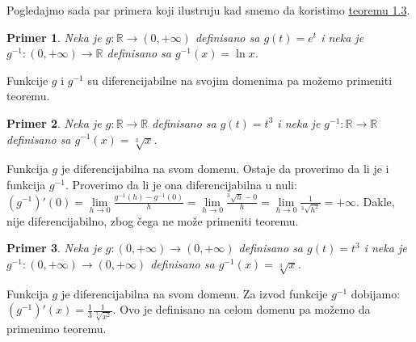 \documentclass{article}
\newtheorem{prim}{Primer}[section]
\begin{document}
Pogledajmo sada par primera koji ilustruju kad smemo da
koristimo \hyperref[teorema_1.3]{teoremu 1.3}.\par

\begin{primbox}
    \label{primer_1.9}
    \begin{prim}
        Neka je $g: \mathbb{R} \longrightarrow \left(0, +\infty\right)$ definisano sa
        $g\left(t\right) = e^t$ i neka je $g^{-1}:\left(0, +\infty\right)\longrightarrow \mathbb{R}$
        definisano sa $g^{-1}\left(x\right) = \ln{x}$.
    \end{prim}
    Funkcije $g$ i $g^{-1}$
    su diferencijabilne na svojim domenima pa možemo primeniti teoremu.
\end{primbox}

\begin{primbox}
    \label{primer_1.10}
    \begin{prim}
        Neka je $g:\mathbb{R}\longrightarrow\mathbb{R}$
        definisano sa $g\left(t\right) = t^3$ i neka je $g^{-1}:\mathbb{R}\longrightarrow\mathbb{R}$
        definisano sa $g^{-1}\left(x\right) = \sqrt[3]{x}$.
    \end{prim}
    Funkcija $g$ je diferencijabilna
    na svom domenu. Ostaje da proverimo da li je i funkcija $g^{-1}$. Proverimo da li je ona diferencijabilna u nuli:
    $\left(g^{-1}\right)'\left(0\right) = \lim\limits_{h\longrightarrow 0}\frac{g^{-1}\left(h\right) - g^{-1}\left(0\right)}{h} = \lim\limits_{h\longrightarrow 0}\frac{^3\sqrt{h} - 0}{h} = \lim\limits_{h\longrightarrow 0}\frac{1}{^3\sqrt{h^2}} = +\infty$.
    Dakle, nije diferencijabilno, zbog čega ne može primeniti teoremu.\par
\end{primbox}

\begin{primbox}
    \label{primer_1.11}
    \begin{prim}
        Neka je $g: \left(0, +\infty\right) \longrightarrow \left(0, +\infty\right)$
        definisano sa $ g\left(t\right) = t^3$ i neka je $g^{-1}: \left(0,+\infty\right)\longrightarrow\left(0,+\infty\right)$
        definisano sa $ g^{-1}\left(x\right) = \sqrt[3]{x}$.
    \end{prim}
    Funkcija $g$ je diferencijabilna na svom domenu.
    Za izvod funkcije $g^{-1}$ dobijamo: $\left(g^{-1}\right)'\left(x\right) = \frac{1}{3}\frac{1}{\sqrt[3]{x^2}}$.
    Ovo je definisano na celom domenu pa možemo da primenimo teoremu.\par
\end{primbox}
\end{document}
